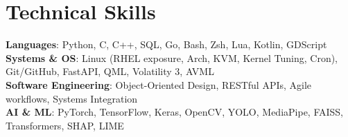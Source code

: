 \documentclass[letterpaper,11pt]{article}
\begin{document}
\section{Technical Skills}
 \begin{itemize}[leftmargin=20pt, label={}]
    \small{\item{
     \textbf{Languages}{: Python, C, C++, SQL, Go, Bash, Zsh, Lua, Kotlin, GDScript} \\
     \textbf{Systems \& OS}{: Linux (RHEL exposure, Arch, KVM, Kernel Tuning, Cron), Git/GitHub, FastAPI, QML, Volatility 3, AVML} \\
     \textbf{Software Engineering}{: Object-Oriented Design, RESTful APIs, Agile workflows, Systems Integration} \\
     \textbf{AI \& ML}{: PyTorch, TensorFlow, Keras, OpenCV, YOLO, MediaPipe, FAISS, Transformers, SHAP, LIME}
    }}
 \end{itemize}
\end{document}
